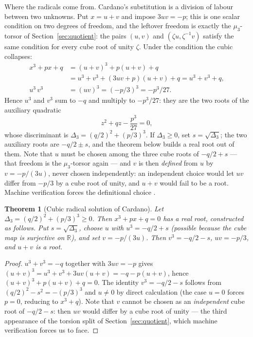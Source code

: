 \documentclass[submission,noinfoline]{jsfds}
\newtheorem{theorem}{Theorem}
\newcommand{\Lean}[1]{}
\begin{document}
Where the radicals come from. Cardano's substitution is a division of
labour between two unknowns. Put $x=u+v$ and impose $3uv=-p$; this is
one scalar condition on two degrees of freedom, and the leftover freedom
is exactly the $\mu_3$-torsor of Section~\ref{sec:quotient}: the pairs
$(u,v)$ and $(\zeta u,\zeta^{-1}v)$ satisfy the same condition for every
cube root of unity $\zeta$. Under the condition the cubic collapses:
\begin{align*}
  x^3+px+q &=(u+v)^3+p(u+v)+q\\
           &=u^3+v^3+(3uv+p)(u+v)+q
            =u^3+v^3+q ,\\
  u^3\,v^3 &=(uv)^3=(-p/3)^3=-p^3/27 .
\end{align*}
Hence $u^3$ and $v^3$ sum to $-q$ and multiply to $-p^3/27$: they are
the two roots of the auxiliary quadratic
\begin{equation*}
  z^2+qz-\frac{p^3}{27}=0,
\end{equation*}
whose discriminant is $\Delta_3=(q/2)^2+(p/3)^3$. If $\Delta_3\ge0$,
set $s=\sqrt{\Delta_3}$; the two auxiliary roots are $-q/2\pm s$, and
the theorem below builds a real root out of them. Note that $u$ must be
chosen among the three cube roots of $-q/2+s$ --- that freedom is the
$\mu_3$-torsor again --- and $v$ is then \emph{defined} from $u$ by
$v=-p/(3u)$, never chosen independently: an independent choice would let
$uv$ differ from $-p/3$ by a cube root of unity, and $u+v$ would fail to
be a root. Machine verification forces the definitional choice
\Lean{vcube, cardano\_certificate}.

\begin{theorem}[Cubic radical solution of Cardano]\label{thm:cubic}
Let $\Delta_3=(q/2)^2+(p/3)^3\ge 0$. Then $x^3+px+q=0$ has a real root,
constructed as follows. Put $s=\sqrt{\Delta_3}$, choose $u$ with
$u^3=-q/2+s$ (possible because the cube map is surjective on $\mathbb R$),
and set $v=-p/(3u)$. Then $v^3=-q/2-s$, $uv=-p/3$, and $u+v$ is a root.
\end{theorem}
\begin{proof}
$u^3+v^3=-q$ together with $3uv=-p$ gives
$(u+v)^3=u^3+v^3+3uv(u+v)=-q-p(u+v)$, hence $(u+v)^3+p(u+v)+q=0$.
The identity $v^3=-q/2-s$ follows from $(q/2)^2-s^2=-(p/3)^3$ and
$u\ne0$ by direct calculation (the case $u=0$ forces $p=0$, reducing to
$x^3+q$). Note that $v$ cannot be chosen as an \emph{independent} cube
root of $-q/2-s$: then $uv$ would differ by a cube root of unity --- the
third appearance of the torsion split of
Section~\ref{sec:quotient}, which machine verification forces us to face.
\Lean{cube\_surj, vcube, cardano\_certificate, cubic\_solvable}
\end{proof}
\end{document}
